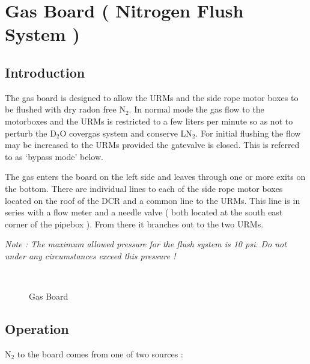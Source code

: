 
\chapter{Gas Board ( Nitrogen Flush System )}
  
   
  
\section{Introduction}  

  The gas board is designed to allow the URMs and the side rope motor boxes
to be flushed with dry  radon free N$_2$. In normal mode  the gas flow to the
motorboxes and the URMs is restricted to a few liters per minute so as
not to perturb the D$_2$O covergas system and conserve LN$_2$. For initial
flushing the flow may be increased to the URMs provided the gatevalve is closed.
This is referred to as `bypass mode' below.

 The gas enters the board on the left side and leaves through one or more exits
 on the bottom. There are individual lines to each of the side rope motor boxes
located on the roof of the DCR and a common line to the URMs. This line is in series with
a flow meter and a needle valve ( both located at the south east corner of
the pipebox ). From there it branches out to the two URMs.


 
 {\em Note : The maximum allowed pressure for the flush system is 10 psi.
Do not under any circumstances exceed this pressure ! }

 


\begin{figure}[htb]
\begin{center}
\leavevmode
\epsfxsize=7in
~\\
\caption[Gas Board]
        {Gas Board
        }
\end{center}
\end{figure}

\section{Operation}

  N$_2$ to the board comes from one of two sources :

